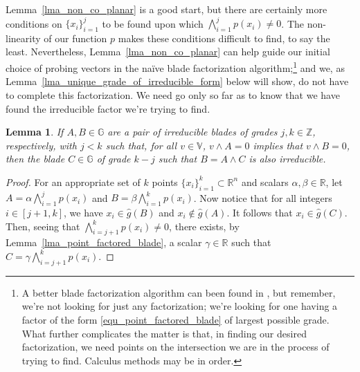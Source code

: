 \documentclass{birkjour}
\newtheorem{lem}[thm]{Lemma}
\theoremstyle{definition}
\theoremstyle{remark}
\numberwithin{equation}{section}
\newcommand{\R}{\mathbb{R}}
\newcommand{\G}{\mathbb{G}}
\newcommand{\V}{\mathbb{V}}
\newcommand{\Z}{\mathbb{Z}}
\newcommand{\gh}{\hat{g}}
\begin{document}
Lemma~\ref{lma_non_co_planar} is a good start, but there are certainly more conditions on $\{x_i\}_{i=1}^j$ to be found upon which
$\bigwedge_{i=1}^j p(x_i)\neq 0$.  The non-linearity of our function $p$ makes these conditions difficult to find, to say the least.
Nevertheless, Lemma~\ref{lma_non_co_planar} can help guide our initial choice of probing vectors in the na\"{i}ve blade factorization
algorithm;\footnote{A better blade factorization algorithm can been found in \cite{Dorst10}, but remember, we're not looking
for just any factorization; we're looking for one having a factor of the form \eqref{equ_point_factored_blade} of largest possible grade.
What further complicates the matter is that, in finding
our desired factorization, we need points on
the intersection we are in the process of trying to find.  Calculus methods may be in order.} and we, as
Lemma~\ref{lma_unique_grade_of_irreducible_form} below will show,
do not have to complete this factorization.  We need go only so far as to know
that we have found the irreducible factor we're trying to find.

\begin{lem}\label{lma_irreducibles_factor_as_irreducibles}
If $A,B\in\G$ are a pair of irreducible blades of grades $j,k\in\Z$, respectively, with $j<k$ such that,
for all $v\in\V$, $v\wedge A=0$ implies that $v\wedge B=0$, then the
blade $C\in\G$ of grade $k-j$ such that $B=A\wedge C$ is
also irreducible.
\end{lem}
\begin{proof}
For an appropriate set of $k$ points $\{x_i\}_{i=1}^k\subset\R^n$ and scalars $\alpha,\beta\in\R$,
let $A=\alpha\bigwedge_{i=1}^j p(x_i)$ and $B=\beta\bigwedge_{i=1}^k p(x_i)$.
Now notice that for all integers $i\in[j+1,k]$, we have $x_i\in\gh(B)$ and $x_i\not\in\gh(A)$.
It follows that $x_i\in\gh(C)$.  Then, seeing that $\bigwedge_{i=j+1}^k p(x_i)\neq 0$,
there exists, by Lemma~\ref{lma_point_factored_blade},  a scalar $\gamma\in\R$ such
that $C=\gamma\bigwedge_{i=j+1}^k p(x_i)$.
\end{proof}
\end{document}
